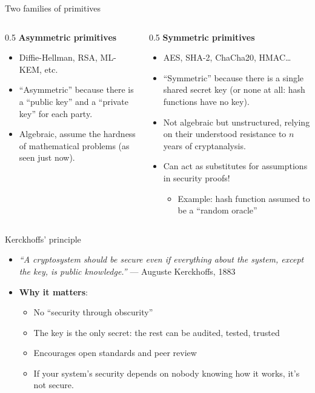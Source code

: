 \ifdefined\PRESENTATION\else\PassOptionsToClass{handout}{beamer}\fi\documentclass[aspectratio=169, lualatex]{beamer}
\begin{document}
\begin{frame}{Two families of primitives}
	\begin{columns}[c]
		\begin{column}{0.5\textwidth}
			\textbf{Asymmetric primitives}
			\begin{itemize}[<+->]
				\item Diffie-Hellman, RSA, ML-KEM, etc.
				\item ``Asymmetric'' because there is a ``public key'' and a ``private
				      key'' for each party.
				\item Algebraic, assume the hardness of mathematical problems (as seen
				      just now).
			\end{itemize}
		\end{column}

		\begin{column}{0.5\textwidth}
			\textbf{Symmetric primitives}
			\begin{itemize}[<+->]
				\item AES, SHA-2, ChaCha20, HMAC\ldots
				\item ``Symmetric'' because there is a single shared secret key (or none at all: hash functions have no key).
				\item Not algebraic but unstructured, relying on their understood
				      resistance to $n$ years of cryptanalysis.
				\item Can act as substitutes for assumptions in security proofs!
				      \begin{itemize}
					      \item Example: hash function assumed to be a ``random oracle''
				      \end{itemize}
			\end{itemize}
		\end{column}
	\end{columns}
\end{frame}

\begin{frame}{Kerckhoffs' principle}
	\begin{itemize}[<+->]
		\item \textit{``A cryptosystem should be secure even if everything about
			      the system, except the key, is public knowledge.''} --- Auguste Kerckhoffs,
		      1883
		\item \textbf{Why it matters}:
		      \begin{itemize}[<+->]
			      \item No ``security through obscurity''
			      \item The key is the only secret: the rest can be audited, tested,
			            trusted
			      \item Encourages open standards and peer review
			      \item If your system's security depends on nobody knowing how it works,
			            it's not secure.
		      \end{itemize}
	\end{itemize}
\end{frame}
\end{document}
